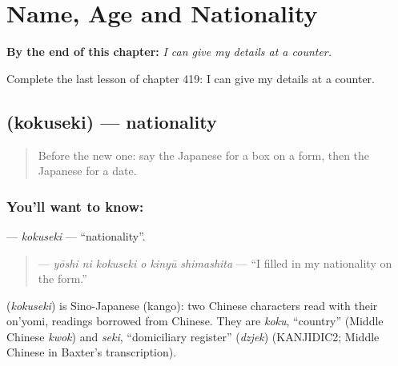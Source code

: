 
\chapter{Name, Age and Nationality}
\label{ch:ja-name-age-and-nationality}

\begin{chapteropening}
\textbf{By the end of this chapter:} \emph{I can give my details at a counter.}

Complete the last lesson of chapter 419: I can give my details at a counter.
\end{chapteropening}

\section[\texorpdfstring{\ja{こくせき} (kokuseki)}{こくせき (kokuseki)}]{ (kokuseki) — nationality}

\label{lesson:JA-C419-kokuseki}



\begin{quote}
Before the new one: say the Japanese for a box on a form, then the Japanese for a date.
\end{quote}

\subsection*{You'll want to know: }
\textbf{} — \emph{kokuseki} — \textquotedblleft{}nationality\textquotedblright{}.

\begin{quote}
\textbf{  } — \emph{yōshi ni kokuseki o kinyū shimashita} — \textquotedblleft{}I filled in my nationality on the form.\textquotedblright{}
\end{quote}

\begin{cousinweb}
\textbf{} (\emph{kokuseki}) is Sino-Japanese (kango): two Chinese characters read with their on'yomi, readings borrowed from Chinese. They are \emph{koku}, \textquotedblleft{}country\textquotedblright{} (Middle Chinese \emph{kwok}) and \emph{seki}, \textquotedblleft{}domiciliary register\textquotedblright{} (\emph{dzjek}) (KANJIDIC2; Middle Chinese in Baxter's transcription).
\end{cousinweb}

